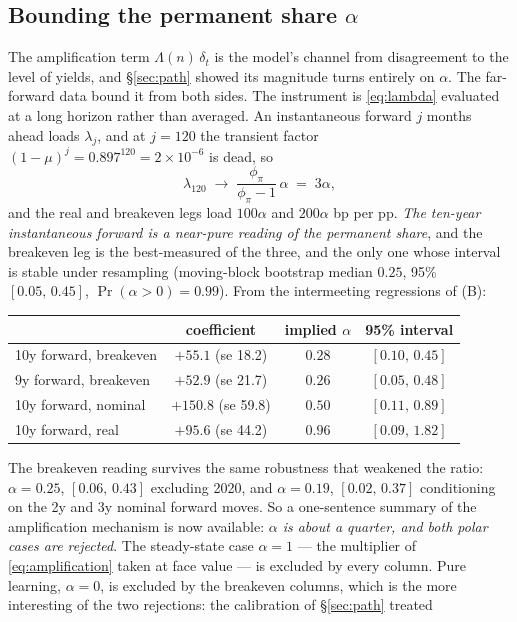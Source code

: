 \documentclass[11pt]{article}
\begin{document}
\subsection{Bounding the permanent share $\alpha$}
\label{sec:test-alpha}
The amplification term $\Lambda(n)\,\delta_t$ is the model's channel from
disagreement to the level of yields, and \S\ref{sec:path} showed its magnitude
turns entirely on $\alpha$. The far-forward data bound it from both sides.
The instrument is \eqref{eq:lambda} evaluated at a long horizon rather than
averaged. An instantaneous forward $j$ months ahead loads $\lambda_j$, and at
$j=120$ the transient factor $(1-\mu)^{j} = 0.897^{120} = 2\times10^{-6}$ is
dead, so
\[
\lambda_{120} \;\to\; \frac{\phi_\pi}{\phi_\pi-1}\,\alpha \;=\; 3\alpha ,
\]
and the real and breakeven legs load $100\alpha$ and $200\alpha$ bp per pp.
\emph{The ten-year instantaneous forward is a near-pure reading of the
permanent share}, and the breakeven leg is the best-measured of the three,
and the only one whose interval is stable under resampling (moving-block
bootstrap median $0.25$, 95\% $[0.05,\,0.45]$, $\Pr(\alpha>0)=0.99$).
From the intermeeting regressions of (B):
\begin{center}\small
\begin{tabular}{lccc}
\toprule
& coefficient & implied $\alpha$ & 95\% interval\\
\midrule
10y forward, breakeven & $+55.1$ (se 18.2) & $\mathbf{0.28}$ & $[0.10,\,0.45]$\\
9y forward, breakeven & $+52.9$ (se 21.7) & $0.26$ & $[0.05,\,0.48]$\\
10y forward, nominal & $+150.8$ (se 59.8) & $0.50$ & $[0.11,\,0.89]$\\
10y forward, real & $+95.6$ (se 44.2) & $0.96$ & $[0.09,\,1.82]$\\
\bottomrule
\end{tabular}
\end{center}
\noindent The breakeven reading survives the same robustness that weakened the
ratio: $\alpha=0.25$, $[0.06,\,0.43]$ excluding 2020, and $\alpha=0.19$,
$[0.02,\,0.37]$ conditioning on the 2y and 3y nominal forward moves. So a
one-sentence summary of the amplification mechanism is now available:
\emph{$\alpha$ is about a quarter, and both polar cases are rejected}. The
steady-state case $\alpha=1$ --- the multiplier of \eqref{eq:amplification}
taken at face value --- is excluded by every column. Pure learning,
$\alpha=0$, is excluded by the breakeven columns, which is the more interesting
of the two rejections: the calibration of \S\ref{sec:path} treated
\end{document}
